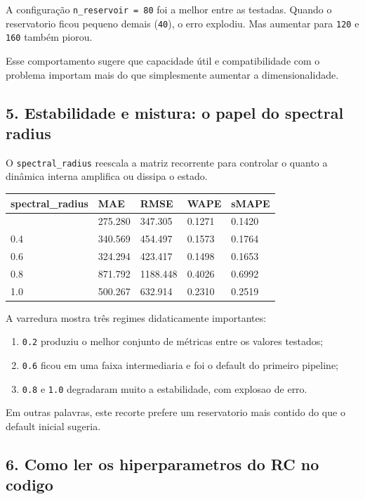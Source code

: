 \documentclass[12pt]{article}
\providecommand{\tightlist}{%
          \setlength{\itemsep}{0pt}\setlength{\parskip}{0pt}}
\begin{document}
A configuração \texttt{n\_reservoir\ =\ 80} foi a melhor entre as testadas. Quando o reservatorio ficou pequeno demais (\texttt{40}), o erro explodiu. Mas aumentar para \texttt{120} e \texttt{160} também piorou.

Esse comportamento sugere que capacidade útil e compatibilidade com o problema importam mais do que simplesmente aumentar a dimensionalidade.

\subsection{5. Estabilidade e mistura: o papel do spectral radius}\label{5-estabilidade-e-mistura-o-papel-do-spectral-radius}

O \texttt{spectral\_radius} reescala a matriz recorrente para controlar o quanto a dinâmica interna amplifica ou dissipa o estado.

\begin{longtable}[]{@{}lllll@{}}
\toprule\noalign{}
spectral\_radius & MAE & RMSE & WAPE & sMAPE \\
\midrule\noalign{}
\endhead
\bottomrule\noalign{}
\endlastfoot
0.2 & 275.280 & 347.305 & 0.1271 & 0.1420 \\
0.4 & 340.569 & 454.497 & 0.1573 & 0.1764 \\
0.6 & 324.294 & 423.417 & 0.1498 & 0.1653 \\
0.8 & 871.792 & 1188.448 & 0.4026 & 0.6992 \\
1.0 & 500.267 & 632.914 & 0.2310 & 0.2519 \\
\end{longtable}

A varredura mostra três regimes didaticamente importantes:

\begin{enumerate}
\def\labelenumi{\arabic{enumi}.}
\tightlist
\item
  \texttt{0.2} produziu o melhor conjunto de métricas entre os valores testados;
\item
  \texttt{0.6} ficou em uma faixa intermediaria e foi o default do primeiro pipeline;
\item
  \texttt{0.8} e \texttt{1.0} degradaram muito a estabilidade, com explosao de erro.
\end{enumerate}

Em outras palavras, este recorte prefere um reservatorio mais contido do que o default inicial sugeria.

\subsection{6. Como ler os hiperparametros do RC no codigo}\label{6-como-ler-os-hiperparametros-do-rc-no-codigo}
\end{document}
